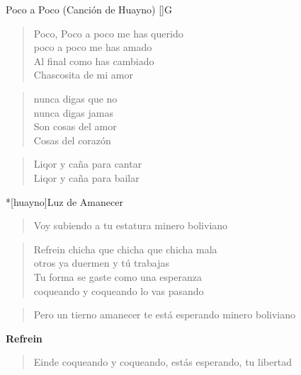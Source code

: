 \begin{song}[huayno]{Poco a Poco (Canción de Huayno)}
[]{G}
\begin{verse}{}
Poco, Poco a poco me has querido\\
poco a poco me has amado\\
Al final como has cambiado\\
Chascosita de mi amor
\end{verse}

\begin{verse}{}
nunca digas que no\\
nunca digas jamas\\
Son cosas del amor\\
Cosas del corazón
\end{verse}

\begin{verse}{}
Liqor y caña para cantar\\
Liqor y caña para bailar
\end{verse}
\end{song}

\begin{song}*[huayno]{Luz de Amanecer}
\begin{verse}{}
Voy subiendo a tu estatura minero boliviano
\end{verse}

\begin{verse}{Refrein}
chicha que chicha que chicha mala\\
otros ya duermen y tú trabajas\\
Tu forma se gaste como una esperanza\\
coqueando y coqueando lo vas pasando
\end{verse}

\begin{verse}{}
Pero un tierno amanecer te está esperando minero boliviano
\end{verse}

\textbf{Refrein}

\begin{verse}{Einde}
coqueando y coqueando, estás esperando, tu libertad
\end{verse}
\end{song}
